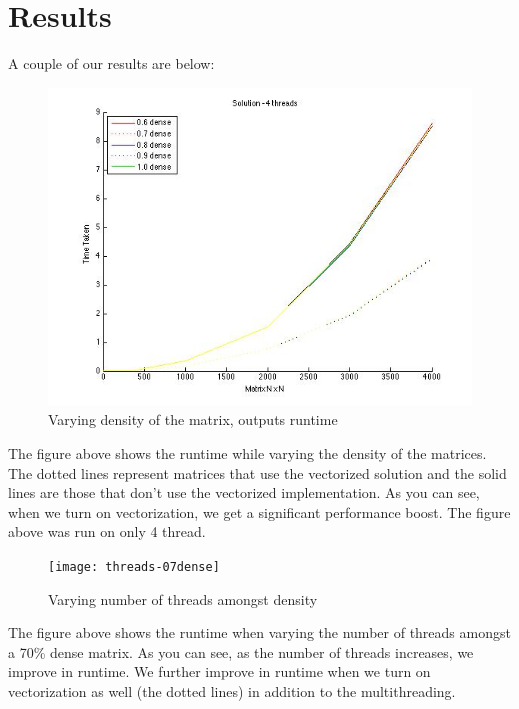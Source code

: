 \documentclass[10pt]{article}
\begin{document}
\section{Results}
\label{results}
\sf A couple of our results are below:
\begin{figure}[H]
    \centering
    \includegraphics[width=\textwidth]{density-4threads}
    \caption{Varying density of the matrix, outputs runtime}
\end{figure}
\sf The figure above shows the runtime while varying the density of the matrices. The dotted
lines represent matrices that use the vectorized solution and the solid lines are those that
don't use the vectorized implementation. As you can see, when we turn on vectorization,
we get a significant performance boost. The figure above was run on only 4 thread.
\begin{figure}[H]
    \centering
    \texttt{[image: threads-07dense]}
    \caption{Varying number of threads amongst density}
\end{figure}
\sf The figure above shows the runtime when varying the number of threads amongst a 70\%
dense matrix. As you can see, as the number of threads increases, we improve in runtime.
We further improve in runtime when we turn on vectorization as well (the dotted lines) in
addition to the multithreading.
\end{document}
